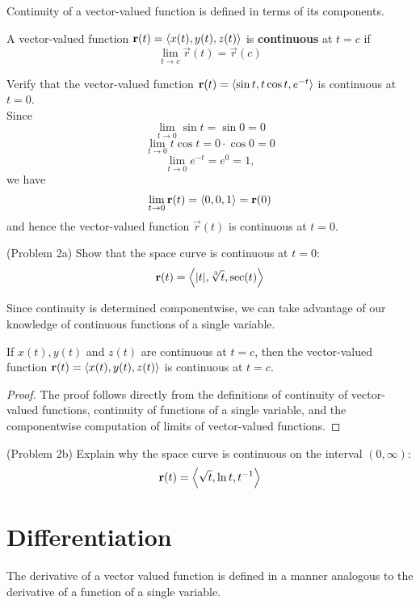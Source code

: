 \documentclass[handout]{ximera}
\begin{document}
Continuity of a vector-valued function is defined in terms of its components.

\begin{definition}
A vector-valued function $\mathbf r(t) = \left\langle x(t), y(t), z(t)\right\rangle$ is
\textbf{continuous} at $t = c$ if
\[
\lim_{t \to c} \vec r(t) = \vec r(c)
\]
\end{definition}

\begin{example}[Example 2]
Verify that the vector-valued function $\mathbf r(t) = \left\langle \sin t, t \cos t, e^{-t}\right\rangle$ is continuous at $t = 0$.\\
Since
\[
\lim_{t \to 0} \sin t =  \sin 0 = 0
\]
\[
\lim_{t \to 0} t \cos t =  0 \cdot \cos 0 = 0
\]
\[
\lim_{t \to 0} e^{-t} =  e^0 = 1,
\]
we have
\[
\lim_{t \to 0} \mathbf r(t) = \left\langle 0, 0, 1\right\rangle = \mathbf r(0)
\]
and hence the vector-valued function $\vec r(t)$ is continuous at $t = 0$.

\end{example}

\begin{problem}(Problem 2a)
Show that the space curve is continuous at $t = 0$:
\[
\mathbf r(t) = \left\langle |t|,\sqrt[3] t, \sec(t)\right\rangle
\]
\end{problem}

Since continuity is determined componentwise, we can take advantage of our knowledge of 
continuous functions of a single variable.

\begin{proposition}[Continuity]
If $x(t), y(t)$ and $z(t)$ are continuous at $t = c$, then the vector-valued function $\mathbf r(t) = \left\langle x(t), y(t), z(t)\right\rangle$
is continuous at $t = c$.
\end{proposition}
\begin{proof}
The proof follows directly from the definitions of continuity of vector-valued functions, continuity of functions of a single 
variable, and the componentwise computation of limits of vector-valued functions.
\end{proof}

\begin{problem}(Problem 2b)
Explain why the space curve is continuous on the interval $(0, \infty)$:
\[
\mathbf r(t) = \left\langle  \sqrt t, \ln t, t^{-1}\right\rangle
\]
\end{problem}

\section{Differentiation}
The derivative of a vector valued function is defined in a manner analogous to the derivative of a function of a single variable.
\end{document}
